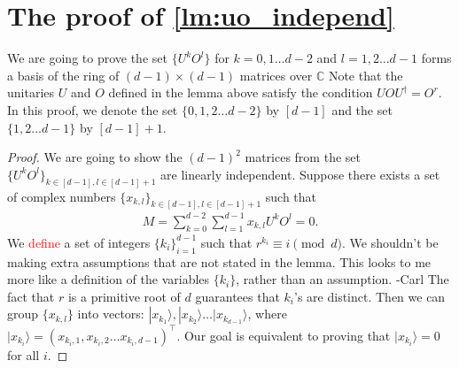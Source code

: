 \documentclass[11pt,letterpaper]{article}
\newcommand{\ket}[1]{|#1\rangle}
\newcommand{\C}{\mathbb{C}}
\newcommand{\1}{\mathbb{1}}
\def\carl#1{{\color{blue} #1 -Carl}}
\newcommand{\hf}[1]{\textcolor{red}{#1}}
\theoremstyle{definition}
\begin{document}
\section{The proof of \cref{lm:uo_independ}}
\label{sec:u_and_o}

We are going to prove 
the set $\{U^k O^l\}$ for $k=0,1\dots d-2$ and $l = 1,2\dots d-1$ forms a basis of the ring of $(d-1)\times (d-1)$ matrices over $\C$
Note that the unitaries $U$ and $O$ defined in the lemma above satisfy the condition $UOU^\dagger = O^r$.
In this proof, we denote the set $\{0,1,2\dots d-2\}$ by $[d-1]$ and the set $\{1,2 \dots d-1\}$ by $[d-1]+1$.
\begin{proof}
We are going to show the $(d-1)^2$ matrices from the set $\{U^k O^l\}_{k \in[d-1], l \in [d-1]+1}$ are linearly independent.
Suppose there exists a set of complex numbers $\{ x_{k,l} \}_{k \in[d-1], l \in [d-1]+1}$
such that 
\begin{align}
	M = \sum_{k=0}^{d-2} \sum_{l=1}^{d-1} x_{k,l} U^k O^l = 0. 
\end{align}
We \hf{define} a set of integers $\{ k_i \}_{i=1}^{d-1}$ such that $r^{k_i} \equiv i \pmod{d}$.
\carl{We shouldn't be making extra assumptions that are not stated in the lemma.  This looks to me more like
a definition of the variables $\{ k_i \}$, rather than an assumption.}
The fact that $r$ is a primitive root of $d$ guarantees that $k_i$'s are distinct.
Then we can group $\{x_{k,l}\}$ into vectors: $\ket{x_{k_1}}, \ket{x_{k_2}} \dots \ket{x_{k_{d-1}}}$,
where $\ket{x_{k_i}}= (x_{k_i, 1}, x_{k_i, 2} \dots x_{k_i, d-1})^\intercal$.
Our goal is equivalent to proving that $\ket{x_{k_i}} = 0$ for all $i$.


\end{proof}
\end{document}
